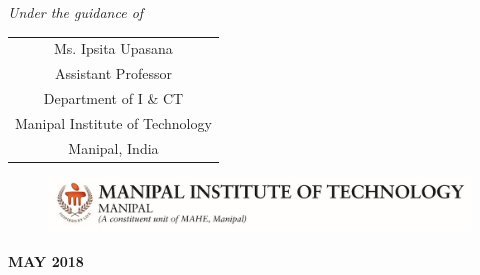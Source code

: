 \documentclass[runningheads,a4paper,12pt]{report}
\renewcommand{\baselinestretch}{1.66}
\begin{document}
\begin{titlepage}
	\begin{center}
	\small{\textit{Under the guidance of}} \\
\renewcommand{\baselinestretch}{1}
\begin{table}[h]
	\centering
		\begin{tabular}{ c }
            Ms. Ipsita Upasana \\
    		Assistant Professor \\
    		Department of I \& CT \\
    		 Manipal Institute of Technology \\
    		Manipal, India
		\end{tabular}
\end{table}
	\end{center}
	\begin{figure}[h]
    \begin{center}
	\includegraphics[scale=1]{MITLogo}
	\end{center}
	\end{figure}
	\begin{center}
	\textbf{MAY 2018}
	\end{center}
\end{titlepage}

\setcounter{secnumdepth}{3}
\setcounter{tocdepth}{3}






\tableofcontents
\listoftables
{}
\listoffigures
{}








\addappheadtotoc
\appendixpage



\renewcommand{\bibname}{References} %

\rhead{}

\end{document}
